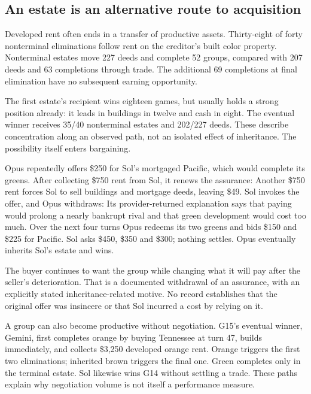 \subsection{An estate is an alternative route to acquisition}
Developed rent often ends in a transfer of productive assets. Thirty-eight of forty nonterminal eliminations follow rent on the creditor's built color property. Nonterminal estates move 227 deeds and complete 52 groups, compared with 207 deeds and 63 completions through trade. The additional 69 completions at final elimination have no subsequent earning opportunity.

The first estate's recipient wins eighteen games, but usually holds a strong position already: it leads in buildings in twelve and cash in eight. The eventual winner receives 35/40 nonterminal estates and 202/227 deeds. These describe concentration along an observed path, not an isolated effect of inheritance. The possibility itself enters bargaining.

Opus repeatedly offers \$250 for Sol's mortgaged Pacific, which would complete its greens. After collecting \$750 rent from Sol, it renews the assurance:
Another \$750 rent forces Sol to sell buildings and mortgage deeds, leaving \$49. Sol invokes the offer, and Opus withdraws:
Its provider-returned explanation says that paying would prolong a nearly bankrupt rival and that green development would cost too much. Over the next four turns Opus redeems its two greens and bids \$150 and \$225 for Pacific. Sol asks \$450, \$350 and \$300; nothing settles. Opus eventually inherits Sol's estate and wins.

The buyer continues to want the group while changing what it will pay after the seller's deterioration. That is a documented withdrawal of an assurance, with an explicitly stated inheritance-related motive. No record establishes that the original offer was insincere or that Sol incurred a cost by relying on it.

A group can also become productive without negotiation. G15's eventual winner, Gemini, first completes orange by buying Tennessee at turn 47, builds immediately, and collects \$3,250 developed orange rent. Orange triggers the first two eliminations; inherited brown triggers the final one. Green completes only in the terminal estate. Sol likewise wins G14 without settling a trade. These paths explain why negotiation volume is not itself a performance measure.
